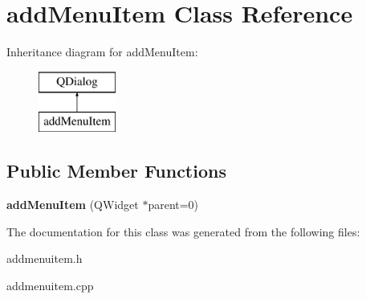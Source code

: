 \hypertarget{classadd_menu_item}{}\section{add\+Menu\+Item Class Reference}
\label{classadd_menu_item}
Inheritance diagram for add\+Menu\+Item\+:\begin{figure}[H]
\begin{center}
\leavevmode
\includegraphics[height=2.000000cm]{classadd_menu_item}
\end{center}
\end{figure}
\subsection*{Public Member Functions}
\begin{DoxyCompactItemize}
\item 
\mbox{\label{classadd_menu_item_a516e0cb12135a23a4378d1f0c69b3166}} 
{\bfseries add\+Menu\+Item} (Q\+Widget $\ast$parent=0)
\end{DoxyCompactItemize}


The documentation for this class was generated from the following files\+:\begin{DoxyCompactItemize}
\item 
addmenuitem.\+h\item 
addmenuitem.\+cpp\end{DoxyCompactItemize}
